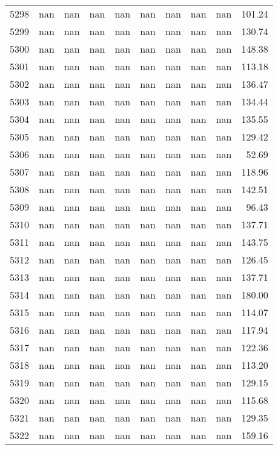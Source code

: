 \begin{tabular}{lrrrrrrrrr}
5298 & nan & nan & nan & nan & nan & nan & nan & nan & 101.24 \\
5299 & nan & nan & nan & nan & nan & nan & nan & nan & 130.74 \\
5300 & nan & nan & nan & nan & nan & nan & nan & nan & 148.38 \\
5301 & nan & nan & nan & nan & nan & nan & nan & nan & 113.18 \\
5302 & nan & nan & nan & nan & nan & nan & nan & nan & 136.47 \\
5303 & nan & nan & nan & nan & nan & nan & nan & nan & 134.44 \\
5304 & nan & nan & nan & nan & nan & nan & nan & nan & 135.55 \\
5305 & nan & nan & nan & nan & nan & nan & nan & nan & 129.42 \\
5306 & nan & nan & nan & nan & nan & nan & nan & nan & 52.69 \\
5307 & nan & nan & nan & nan & nan & nan & nan & nan & 118.96 \\
5308 & nan & nan & nan & nan & nan & nan & nan & nan & 142.51 \\
5309 & nan & nan & nan & nan & nan & nan & nan & nan & 96.43 \\
5310 & nan & nan & nan & nan & nan & nan & nan & nan & 137.71 \\
5311 & nan & nan & nan & nan & nan & nan & nan & nan & 143.75 \\
5312 & nan & nan & nan & nan & nan & nan & nan & nan & 126.45 \\
5313 & nan & nan & nan & nan & nan & nan & nan & nan & 137.71 \\
5314 & nan & nan & nan & nan & nan & nan & nan & nan & 180.00 \\
5315 & nan & nan & nan & nan & nan & nan & nan & nan & 114.07 \\
5316 & nan & nan & nan & nan & nan & nan & nan & nan & 117.94 \\
5317 & nan & nan & nan & nan & nan & nan & nan & nan & 122.36 \\
5318 & nan & nan & nan & nan & nan & nan & nan & nan & 113.20 \\
5319 & nan & nan & nan & nan & nan & nan & nan & nan & 129.15 \\
5320 & nan & nan & nan & nan & nan & nan & nan & nan & 115.68 \\
5321 & nan & nan & nan & nan & nan & nan & nan & nan & 129.35 \\
5322 & nan & nan & nan & nan & nan & nan & nan & nan & 159.16 \\

\end{tabular}
